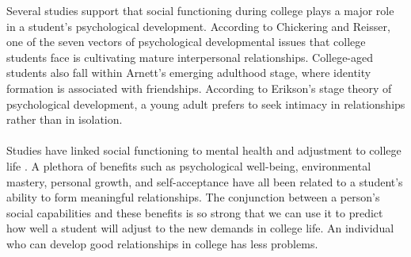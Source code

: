 \documentclass[11pt, draft, journal]{./IEEE/IEEEtran}
\begin{document}
Several studies support that social functioning during college plays a major role in a student's psychological development. According to Chickering and Reisser, one of the seven vectors of psychological developmental issues that college students face is cultivating mature interpersonal relationships\cite{chickering}. College-aged students also fall within Arnett's emerging adulthood stage, where identity formation is associated with friendships\cite{erb}. According to Erikson's stage theory of psychological development, a young adult prefers to seek intimacy in relationships rather than in isolation\cite{erikson}.
\\
\\
\indent Studies have linked social functioning to mental health and adjustment to college life \cite{erb}. A plethora of benefits such as psychological well-being, environmental mastery, personal growth, and self-acceptance have all been related to a student's ability to form meaningful relationships\cite{erb}. The conjunction between a person’s social capabilities and these benefits is so strong that we can use it to predict how well a student  will adjust to the new demands in college life. An individual who can develop good relationships in college has less problems.
\end{document}
